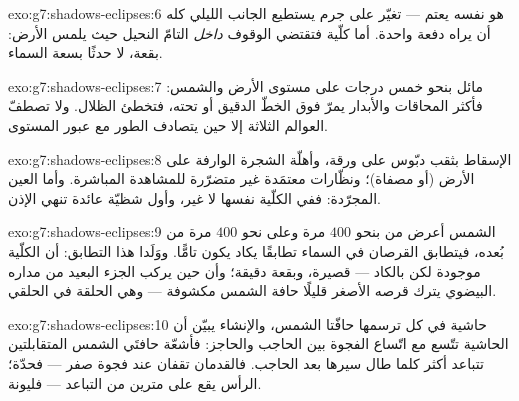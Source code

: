 \begin{solution}{exo:g7:shadows-eclipses:6}
 هو  نفسه يعتم --- تغيّر على جرم يستطيع الجانب
الليلي كله أن يراه دفعة واحدة. أما كلّية  فتقتضي الوقوف
\emph{داخل}   التامّ النحيل حيث يلمس الأرض: بقعة، لا
حدثًا بسعة السماء.
\end{solution}

\begin{solution}{exo:g7:shadows-eclipses:7}
  مائل بنحو خمس درجات على مستوى الأرض والشمس: فأكثر
المحاقات والأبدار يمرّ فوق الخطّ الدقيق أو تحته، فتخطئ الظلال.
ولا تصطفّ العوالم الثلاثة إلا حين يتصادف الطور مع عبور
المستوى.
\end{solution}

\begin{solution}{exo:g7:shadows-eclipses:8}
الإسقاط بثقب دبّوس على ورقة، وأهلّة الشجرة الوارفة على الأرض
(أو مصفاة)؛ ونظّارات  معتمَدة غير متضرّرة للمشاهدة
المباشرة. وأما العين المجرّدة: ففي الكلّية نفسها لا غير، وأول
شظيّة عائدة تنهي الإذن.
\end{solution}

\begin{solution}{exo:g7:shadows-eclipses:9}
الشمس أعرض من  بنحو $400$ مرة وعلى نحو $400$ مرة من
بُعده، فيتطابق القرصان في السماء تطابقًا يكاد يكون تامًّا.
ووَلَدا هذا التطابق: أن الكلّية موجودة لكن بالكاد --- قصيرة،
وبقعة  دقيقة؛ وأن  حين يركب الجزء البعيد من مداره
البيضوي يترك قرصه الأصغر قليلًا حافة الشمس مكشوفة --- وهي
الحلقة في  الحلقي.
\end{solution}

\begin{solution}{exo:g7:shadows-eclipses:10}
حاشية  في كل  ترسمها حافّتا الشمس، والإنشاء يبيّن
أن الحاشية تتّسع مع اتّساع الفجوة بين الحاجب والحاجز: فأشعّة
حافتَي الشمس المتقابلتين تتباعد أكثر كلما طال سيرها بعد
الحاجب. فالقدمان تقفان عند فجوة صفر --- فحدّة؛  الرأس يقع
على مترين من التباعد --- فليونة.
\end{solution}

